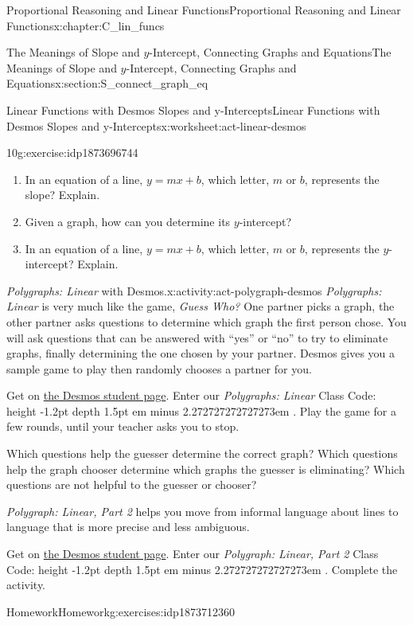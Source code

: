 \documentclass[oneside,10pt,]{book}
\newcommand{\pubtitle}[1]{\textsl{#1}}
\newcommand{\fillin}[1]{\leavevmode\leaders\vrule height -1.2pt depth 1.5pt \hskip #1em minus #1em \null}
\numberwithin{equation}{chapter}
\begin{document}
\begin{chapterptx}{Proportional Reasoning and Linear Functions}{}{Proportional Reasoning and Linear Functions}{}{}{x:chapter:C_lin_funcs}
\begin{sectionptx}{The Meanings of Slope and \(y\)-Intercept, Connecting Graphs and Equations}{}{The Meanings of Slope and \(y\)-Intercept, Connecting Graphs and Equations}{}{}{x:section:S_connect_graph_eq}
\begin{worksheet-subsection}{Linear Functions with Desmos \textemdash{} Slopes and y-Intercepts}{}{Linear Functions with Desmos \textemdash{} Slopes and y-Intercepts}{}{}{x:worksheet:act-linear-desmos}
\begin{divisionexercise}{10}{}{}{g:exercise:idp1873696744}
\begin{enumerate}[font=\bfseries,label=(\alph*),ref=\alph*]
\item{}In an equation of a line, \(y = mx + b\), which letter, \(m\) or \(b\), represents the slope? Explain.%
\item{}Given a graph, how can you determine its \(y\)-intercept?%
\item{}In an equation of a line, \(y = mx + b\), which letter, \(m\) or \(b\), represents the \(y\)-intercept? Explain.%
\end{enumerate}
\end{divisionexercise}%
\end{worksheet-subsection}
\restoregeometry
\begin{activity}{\pubtitle{Polygraphs: Linear} with Desmos.}{x:activity:act-polygraph-desmos}%
\pubtitle{Polygraphs: Linear} is very much like the game, \pubtitle{Guess Who?} One partner picks a graph, the other partner asks questions to determine which graph the first person chose. You will ask questions that can be answered with ``yes'' or ``no'' to try to eliminate graphs, finally determining the one chosen by your partner. Desmos gives you a sample game to play then randomly chooses a partner for you.%
\par
Get on \href{https://student.desmos.com}{the Desmos student page}\footnotemark{}. Enter our \pubtitle{Polygraphs: Linear} Class Code: \fillin{2.272727272727273}. Play the game for a few rounds, until your teacher asks you to stop.%
\par
Which questions help the guesser determine the correct graph? Which questions help the graph chooser determine which graphs the guesser is eliminating? Which questions are not helpful to the guesser or chooser?%
\par
\pubtitle{Polygraph: Linear, Part 2} helps you move from informal language about lines to language that is more precise and less ambiguous.%
\par
Get on \href{https://student.desmos.com}{the Desmos student page}\footnotemark{}. Enter our \pubtitle{Polygraph: Linear, Part 2} Class Code: \fillin{2.272727272727273}. Complete the activity.%
\end{activity}%
%
%
%
%
\typeout{************************************************}
\typeout{************************************************}
%
\begin{exercises-subsection}{Homework}{}{Homework}{}{}{g:exercises:idp1873712360}

\end{exercises-subsection}
\end{sectionptx}
\end{chapterptx}
\end{document}
